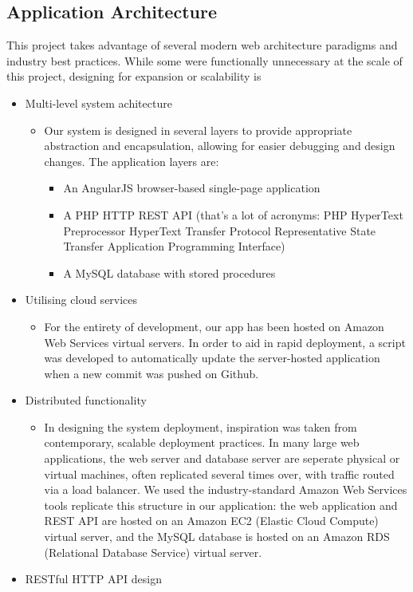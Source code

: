 \subsection{Application Architecture}\label{application-architecture}

This project takes advantage of several modern web architecture
paradigms and industry best practices. While some were functionally
unnecessary at the scale of this project, designing for expansion or
scalability is

\begin{itemize}
\tightlist
\item
  Multi-level system achitecture

  \begin{itemize}
  \tightlist
  \item
    Our system is designed in several layers to provide appropriate
    abstraction and encapsulation, allowing for easier debugging and
    design changes. The application layers are:

    \begin{itemize}
    \tightlist
    \item
      An AngularJS browser-based single-page application
    \item
      A PHP HTTP REST API (that's a lot of acronyms: PHP HyperText
      Preprocessor HyperText Transfer Protocol Representative State
      Transfer Application Programming Interface)
    \item
      A MySQL database with stored procedures
    \end{itemize}
  \end{itemize}
\item
  Utilising cloud services

  \begin{itemize}
  \tightlist
  \item
    For the entirety of development, our app has been hosted on Amazon
    Web Services virtual servers. In order to aid in rapid deployment, a
    script was developed to automatically update the server-hosted
    application when a new commit was pushed on Github.
  \end{itemize}
\item
  Distributed functionality

  \begin{itemize}
  \tightlist
  \item
    In designing the system deployment, inspiration was taken from
    contemporary, scalable deployment practices. In many large web
    applications, the web server and database server are seperate
    physical or virtual machines, often replicated several times over,
    with traffic routed via a load balancer. We used the
    industry-standard Amazon Web Services tools replicate this structure
    in our application: the web application and REST API are hosted on
    an Amazon EC2 (Elastic Cloud Compute) virtual server, and the MySQL
    database is hosted on an Amazon RDS (Relational Database Service)
    virtual server.
  \end{itemize}
\item
  RESTful HTTP API design


\end{itemize}
